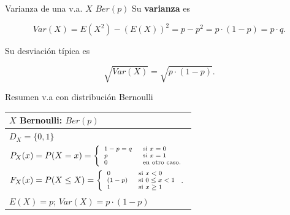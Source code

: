 \documentclass[
  ignorenonframetext,
  aspectratio=169]{beamer}
\begin{document}
\begin{frame}{Varianza de una v.a. \(X\) \(Ber(p)\)}
\protect\hypertarget{varianza-de-una-v.a.-x-berp}{}
Su \textbf{varianza} es

\[Var(X)=E(X^2)-\left(E(X)\right)^2=p-p^2=p\cdot (1-p)=p\cdot q.\]

Su desviación típica es

\[
\sqrt{Var(X)}=\sqrt{p \cdot (1-p)}.
\]
\end{frame}

\begin{frame}{Resumen v.a con distribución Bernoulli}
\protect\hypertarget{resumen-v.a-con-distribuciuxf3n-bernoulli}{}
\renewcommand{\arraystretch}{1.75}
\begin{table}
\centering
\begin{tabular}{|l|}
\hline\rowcolor{LightBlue}
$X$ Bernoulli:  $Ber(p)$ 
\\\hline
$\scriptstyle{ D_X=   \{0,1\}}$  
\\\hline
$\scriptsize{P_X(x)=P(X=x)=
\left\{
\begin{array}{ll}
1-p=q & \mbox{ si } x=0\\
p & \mbox{ si } x=1 \\
0  & \mbox{ en otro caso.}
\end{array}\right.}
$ 
\\\hline
$\scriptsize{  F_X(x)=P(X\leq X)=
\left\{
\begin{array}{ll}
  0 &   \mbox{ si } x<0\\ 
 (1-p)  &  \mbox{ si } 0\leq x< 1 \\ 
1 & \mbox{ si } x\geq 1
\end{array}
\right.}$.
\\\hline
$\scriptstyle E(X)=p$; $\scriptstyle  Var(X)= p \cdot (1-p)$ \\\hline
\end{tabular}
\end{table}
\end{frame}
\end{document}
